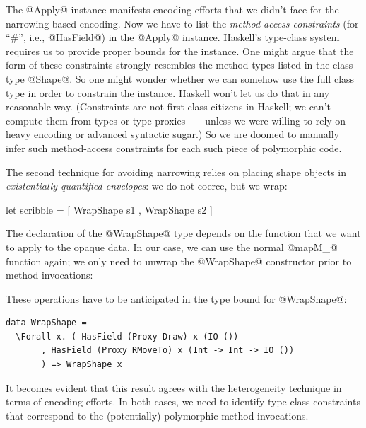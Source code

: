 \noindent
The @Apply@ instance manifests encoding efforts that we didn't face
for the narrowing-based encoding. Now we have to list the
\emph{method-access constraints} (for ``\#'', i.e., @HasField@) in the
@Apply@ instance. Haskell's type-class system requires us to provide
proper bounds for the instance. One might argue that the form of these
constraints strongly resembles the method types listed in the class
type @Shape@. So one might wonder whether we can somehow use the full
class type in order to constrain the instance.  Haskell won't let us
do that in any reasonable way. (Constraints are not first-class
citizens in Haskell; we can't compute them from types or type
proxies~---~unless we were willing to rely on heavy encoding or
advanced syntactic sugar.) So we are doomed to manually infer such
method-access constraints for each such piece of polymorphic code.

The second technique for avoiding narrowing relies on placing shape
objects in \emph{existentially quantified envelopes}: we do not
coerce, but we wrap:

\begin{code}
       let scribble = [ WrapShape s1 , WrapShape s2 ]
\end{code}

\noindent
The declaration of the @WrapShape@ type depends on the function that
we want to apply to the opaque data. In our case, we can use the
normal @mapM_@ function again; we only need to unwrap the @WrapShape@
constructor prior to method invocations:


\noindent
These operations have to be anticipated in the type bound for
@WrapShape@:

\begin{Verbatim}[fontsize=\small,commandchars=\\\{\}]
 data WrapShape =
  \Forall x. ( HasField (Proxy Draw) x (IO ())
       , HasField (Proxy RMoveTo) x (Int -> Int -> IO ())
       ) => WrapShape x
\end{Verbatim}

\noindent
It becomes evident that this result agrees with the heterogeneity
technique in terms of encoding efforts. In both cases, we need to
identify type-class constraints that correspond to the (potentially)
polymorphic method invocations.

